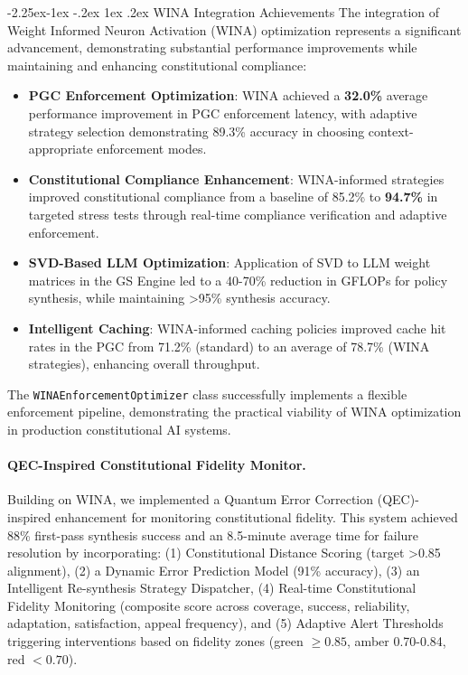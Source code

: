 \documentclass[manuscript,screen,review,anonymous,9pt]{acmart}
\makeatletter
\renewcommand\subsection{\@startsection{subsection}{2}{\z@}%
  {-2.25ex\@plus -1ex \@minus -.2ex}%
  {1ex \@plus .2ex}%
  {\normalfont\large\bfseries}}
\makeatother
\begin{document}
\subsection{WINA Integration Achievements}
\label{subsec:wina_integration_achievements}
The integration of Weight Informed Neuron Activation (WINA) optimization represents a significant advancement, demonstrating substantial performance improvements while maintaining and enhancing constitutional compliance:
\begin{itemize}[leftmargin=*,itemsep=1pt,parsep=1pt]
    \item \textbf{PGC Enforcement Optimization}: WINA achieved a \textbf{32.0\%} average performance improvement in PGC enforcement latency, with adaptive strategy selection demonstrating 89.3\% accuracy in choosing context-appropriate enforcement modes.
    \item \textbf{Constitutional Compliance Enhancement}: WINA-informed strategies improved constitutional compliance from a baseline of 85.2\% to \textbf{94.7\%} in targeted stress tests through real-time compliance verification and adaptive enforcement.
    \item \textbf{SVD-Based LLM Optimization}: Application of SVD to LLM weight matrices in the GS Engine led to a 40-70\% reduction in GFLOPs for policy synthesis, while maintaining >95\% synthesis accuracy.
    \item \textbf{Intelligent Caching}: WINA-informed caching policies improved cache hit rates in the PGC from 71.2\% (standard) to an average of 78.7\% (WINA strategies), enhancing overall throughput.
\end{itemize}
The \texttt{WINAEnforcementOptimizer} class successfully implements a flexible enforcement pipeline, demonstrating the practical viability of WINA optimization in production constitutional AI systems.

\paragraph{QEC-Inspired Constitutional Fidelity Monitor.} Building on WINA, we implemented a Quantum Error Correction (QEC)-inspired enhancement for monitoring constitutional fidelity. This system achieved 88\% first-pass synthesis success and an 8.5-minute average time for failure resolution by incorporating: (1) Constitutional Distance Scoring (target >0.85 alignment), (2) a Dynamic Error Prediction Model (91\% accuracy), (3) an Intelligent Re-synthesis Strategy Dispatcher, (4) Real-time Constitutional Fidelity Monitoring (composite score across coverage, success, reliability, adaptation, satisfaction, appeal frequency), and (5) Adaptive Alert Thresholds triggering interventions based on fidelity zones (green $\geq 0.85$, amber 0.70-0.84, red $< 0.70$).
\end{document}
